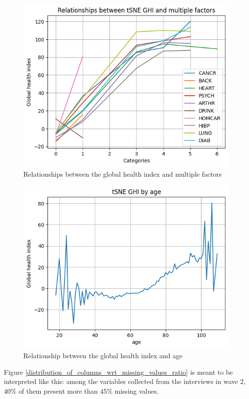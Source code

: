 \documentclass[]{article}
\begin{document}
\begin{figure}[!h]
\centering
\includegraphics[scale=0.75]{relationships_between_tSNE_GHI_and_multiple_factors.png}
\caption{Relationships between the global health index and multiple factors}
\label{relationships_between_tSNE_GHI_and_multiple_factors}
\end{figure}
\begin{figure}[!h]
\centering
\includegraphics[scale=0.75]{tSNE_GHI_by_age.png}
\caption{Relationship between the global health index and age}
\label{tSNE_GHI_by_age}
\end{figure}
Figure \ref{distribution_of_columns_wrt_missing_values_ratio} is meant to be interpreted like this: among the variables collected from the interviews in wave 2, $40$\% of them present more than $45$\% missing values.\\
\end{document}
